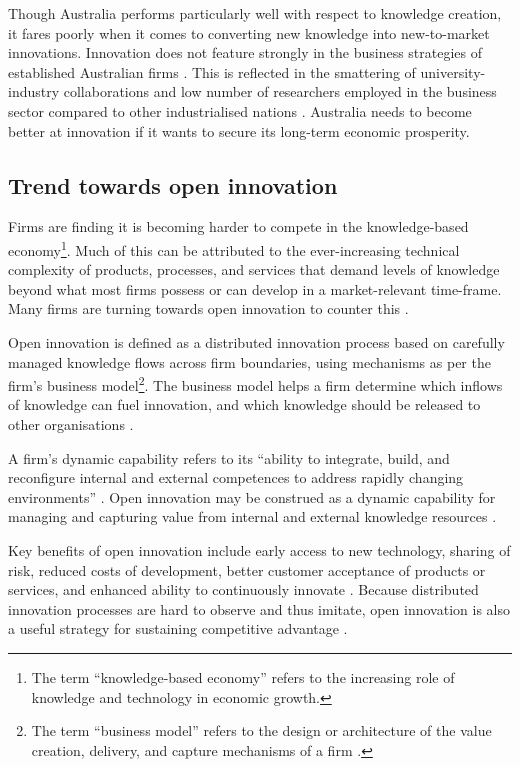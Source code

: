 Though Australia performs particularly well with respect to knowledge creation, it fares poorly when it comes to converting new knowledge into new-to-market innovations. Innovation does not feature strongly in the business strategies of established Australian firms \citep{dodgson2011systems,leung2016view}. This is reflected in the smattering of university-industry collaborations and low number of researchers employed in the business sector compared to other industrialised nations \citep{pettigrew2012australia}. Australia needs to become better at innovation if it wants to secure its long-term economic prosperity. \medskip

\subsection{Trend towards open innovation}

Firms are finding it is becoming harder to compete in the knowledge-based economy\footnote{The term \enquote{knowledge-based economy} refers to the increasing role of knowledge and technology in economic growth.}. Much of this can be attributed to the ever-increasing technical complexity of products, processes, and services that demand levels of knowledge beyond what most firms possess or can develop in a market-relevant time-frame. Many firms are turning towards open innovation to counter this \citep{enkel2009open,bessant2013innovation,stanko2017under}. \medskip

Open innovation is defined as a distributed innovation process based on carefully managed knowledge flows across firm boundaries, using mechanisms as per the firm's business model\footnote{The term \enquote{business model} refers to the design or architecture of the value creation, delivery, and capture mechanisms of a firm \citep{teece2010business}.}. The business model helps a firm determine which inflows of knowledge can fuel innovation, and which knowledge should be released to other organisations \citep{chesbrough2017future}. \medskip 

A firm's dynamic capability refers to its “ability to integrate, build, and reconfigure internal and external competences to address rapidly changing environments” \citep{teece2007explicating}. Open innovation may be construed as a dynamic capability for managing and capturing value from internal and external knowledge resources \citep{lichtenthaler2011open}. 

Key benefits of open innovation include early access to new technology, sharing of risk, reduced costs of development, better customer acceptance of products or services, and enhanced ability to continuously innovate \citep{ye2013exploring}. Because distributed innovation processes are hard to observe and thus imitate, open innovation is also a useful strategy for sustaining competitive advantage \citep{barney1991firm,lichtenthaler2011open}. \medskip

